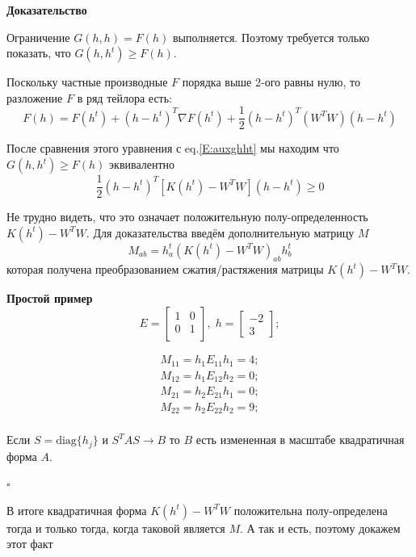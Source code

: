 \documentclass[oneside, final, 12pt]{extarticle}
\begin{document}
\textbf{Доказательство}

Ограничение $G(h,h) = F(h)$ выполняется. Поэтому требуется только
показать, что $G(h,h^t) \geqslant F(h)$.

Поскольку частные производные $F$ порядка выше 2-ого равны нулю,
то разложение $F$ в ряд тейлора есть:
\begin{equation}\label{E:f_taylor}
  F(h) = F(h^t) + (h - h^t)^T \nabla F(h^t)
    + \frac{1}{2} (h - h^t)^T (W^TW) (h - h^t)
\end{equation}

После сравнения этого уравнения с eq.\eqref{E:auxghht} мы находим
что $G(h,h^t) \geqslant F(h)$ эквивалентно
\[
  \frac{1}{2} (h - h^t)^T \left[K(h^t) - W^TW\right] (h - h^t) \geqslant 0
\]

Не трудно видеть, что это означает положительную полу-определенность
$K(h^t) - W^TW$.
Для доказательства введём дополнительную матрицу $M$
\begin{equation}
  M_{ab} = h_a^t (K(h^t) - W^T W)_{ab} h_b^t
\end{equation}
которая получена преобразованием сжатия/растяжения
матрицы $K(h^t) - W^TW$.

\textbf{Простой пример}
\[
  E =
  \begin{bmatrix}
    1 & 0 \\
    0 & 1 \\
  \end{bmatrix}, \;
  h = \begin{bmatrix} -2 \\ 3 \end{bmatrix};
\]

\begin{align*}
  M_{11} = h_1 E_{11} h_1 = 4; \\
  M_{12} = h_1 E_{12} h_2 = 0; \\
  M_{21} = h_2 E_{21} h_1 = 0; \\
  M_{22} = h_2 E_{22} h_2 = 9; \\
\end{align*}

Если $ S = \text{diag}\{h_j\}$ и $S^T A S \rightarrow B$
то $B$ есть измененная в масштабе квадратичная форма $A$.

$\square$

В итоге квадратичная форма $K(h^t) - W^TW$
положительна полу-определена тогда и только
тогда, когда таковой является $M$. А так и есть, поэтому
докажем этот факт
\end{document}
